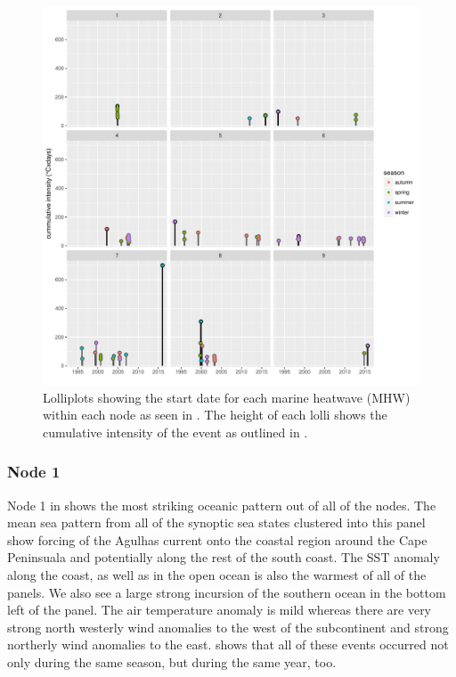 \documentclass[a4paper,10pt,review]{elsarticle}
\begin{document}
\begin{figure}
\includegraphics[width=1.0\textwidth]{figure_5.pdf}
\caption{Lolliplots showing the start date for each marine heatwave (MHW) within each node as seen in . The height of each lolli shows the cumulative intensity of the event as outlined in .}
\label{figure5}
\end{figure}

\subsubsection{Node 1}
Node 1 in  shows the most striking oceanic pattern out of all of the nodes. The mean sea pattern from all of the synoptic sea states clustered into this panel show forcing of the Agulhas current onto the coastal region around the Cape Peninsuala and potentially along the rest of the south coast. The SST anomaly along the coast, as well as in the open ocean is also the warmest of all of the panels. We also see a large strong incursion of the southern ocean in the bottom left of the panel. The air temperature anomaly is mild whereas there are very strong north westerly wind anomalies to the west of the subcontinent and strong northerly wind anomalies to the east.  shows that all of these events occurred not only during the same season, but during the same year, too.
\end{document}
